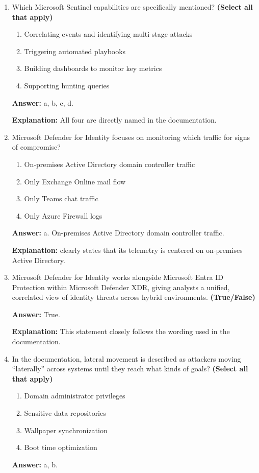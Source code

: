\documentclass[10pt]{article}
\begin{document}
\begin{enumerate}[leftmargin=*]
\textbf{Explanation:} explicitly describes Microsoft Sentinel as a cloud-native SIEM solution.

\item Which Microsoft Sentinel capabilities are specifically mentioned? \textbf{(Select all that apply)}
\begin{enumerate}[label=\alph*., leftmargin=1.5em]
\item Correlating events and identifying multi-stage attacks
\item Triggering automated playbooks
\item Building dashboards to monitor key metrics
\item Supporting hunting queries
\end{enumerate}
\textbf{Answer:} a, b, c, d.

\textbf{Explanation:} All four are directly named in the documentation.

\item Microsoft Defender for Identity focuses on monitoring which traffic for signs of compromise?
\begin{enumerate}[label=\alph*., leftmargin=1.5em]
\item On-premises Active Directory domain controller traffic
\item Only Exchange Online mail flow
\item Only Teams chat traffic
\item Only Azure Firewall logs
\end{enumerate}
\textbf{Answer:} a. On-premises Active Directory domain controller traffic.

\textbf{Explanation:} clearly states that its telemetry is centered on on-premises Active Directory.

\item Microsoft Defender for Identity works alongside Microsoft Entra ID Protection within Microsoft Defender XDR, giving analysts a unified, correlated view of identity threats across hybrid environments. \textbf{(True/False)}

\textbf{Answer:} True.

\textbf{Explanation:} This statement closely follows the wording used in the documentation.

\item In the documentation, lateral movement is described as attackers moving ``laterally'' across systems until they reach what kinds of goals? \textbf{(Select all that apply)}
\begin{enumerate}[label=\alph*., leftmargin=1.5em]
\item Domain administrator privileges
\item Sensitive data repositories
\item Wallpaper synchronization
\item Boot time optimization
\end{enumerate}
\textbf{Answer:} a, b.


\end{enumerate}
\end{document}
